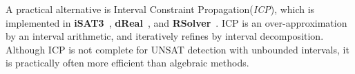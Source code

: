 \documentclass[runningheads,a4paper,oribibl]{llncs}
\begin{document}
A practical alternative is Interval Constraint Propagation({\em ICP})\cite{benhamou:hal-00480814}, 
which is implemented in {\bf iSAT3}~\cite{isat}, {\bf dReal}~\cite{dRealCADE13}, and \textbf{RSolver}~\cite{rsolver}. 
ICP is an over-approximation by an interval arithmetic, and iteratively refines by
interval decomposition. 
Although ICP is not complete for UNSAT detection with unbounded intervals, 
it is practically often more efficient than algebraic methods. 

\end{document}
